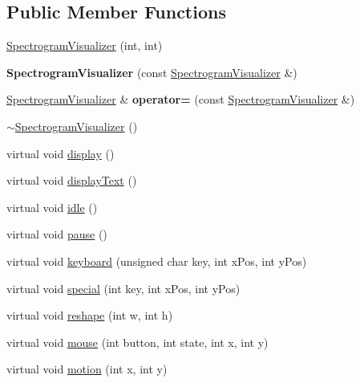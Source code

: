 \subsection*{Public Member Functions}
\begin{DoxyCompactItemize}
\item 
\mbox{\hyperlink{structSpectrogramVisualizer_a7b971af130bf95c4f307e2add2468825}{Spectrogram\+Visualizer}} (int, int)
\item 
\mbox{\label{structSpectrogramVisualizer_a483fbc5948a64946b397ebb6d54146b6}} 
{\bfseries Spectrogram\+Visualizer} (const \mbox{\hyperlink{structSpectrogramVisualizer}{Spectrogram\+Visualizer}} \&)
\item 
\mbox{\label{structSpectrogramVisualizer_a2212e878cb2cf147fd885989e511ed77}} 
\mbox{\hyperlink{structSpectrogramVisualizer}{Spectrogram\+Visualizer}} \& {\bfseries operator=} (const \mbox{\hyperlink{structSpectrogramVisualizer}{Spectrogram\+Visualizer}} \&)
\item 
\mbox{\hyperlink{structSpectrogramVisualizer_a2b55364382a4ee290918a05946505561}{$\sim$\+Spectrogram\+Visualizer}} ()
\item 
virtual void \mbox{\hyperlink{structSpectrogramVisualizer_a529c64c733ffc564764593329c483ae2}{display}} ()
\item 
virtual void \mbox{\hyperlink{structSpectrogramVisualizer_a9b9aa780d95f710b1c876ce49abac9a1}{display\+Text}} ()
\item 
virtual void \mbox{\hyperlink{structSpectrogramVisualizer_a669c19fe9dc24dc89e1cc518edb24de6}{idle}} ()
\item 
virtual void \mbox{\hyperlink{structSpectrogramVisualizer_a301989369e63d88cd6a59d12c23b4551}{pause}} ()
\item 
virtual void \mbox{\hyperlink{structSpectrogramVisualizer_a2901f4ea1e35d4c7e6660f6c19ed468f}{keyboard}} (unsigned char key, int x\+Pos, int y\+Pos)
\item 
virtual void \mbox{\hyperlink{structSpectrogramVisualizer_a631d3522ef8d8bdc6fd9ba9acf2f15ec}{special}} (int key, int x\+Pos, int y\+Pos)
\item 
virtual void \mbox{\hyperlink{structSpectrogramVisualizer_a789c6b59ab3a6960056eaab014163b91}{reshape}} (int w, int h)
\item 
virtual void \mbox{\hyperlink{structSpectrogramVisualizer_a949b2e0bfd260e6f8d63b5867f1b4edf}{mouse}} (int button, int state, int x, int y)
\item 
virtual void \mbox{\hyperlink{structSpectrogramVisualizer_a8ab333867c86cfa188ff026410e271aa}{motion}} (int x, int y)
\end{DoxyCompactItemize}

